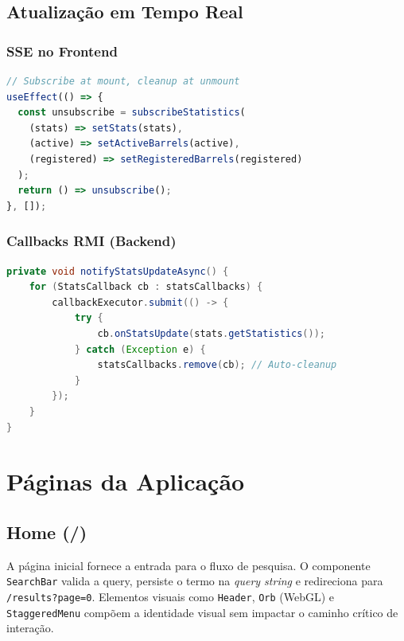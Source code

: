 \documentclass[12pt,a4paper]{article}
\begin{document}
\subsection{Atualização em Tempo Real}

\subsubsection{SSE no Frontend}
\begin{lstlisting}[language=JavaScript, caption={Assinatura SSE com EventSource}]
// Subscribe at mount, cleanup at unmount
useEffect(() => {
  const unsubscribe = subscribeStatistics(
    (stats) => setStats(stats),
    (active) => setActiveBarrels(active),
    (registered) => setRegisteredBarrels(registered)
  );
  return () => unsubscribe();
}, []);
\end{lstlisting}

\subsubsection{Callbacks RMI (Backend)}
\begin{lstlisting}[language=Java, caption={Notificação assíncrona}]
private void notifyStatsUpdateAsync() {
    for (StatsCallback cb : statsCallbacks) {
        callbackExecutor.submit(() -> {
            try {
                cb.onStatsUpdate(stats.getStatistics());
            } catch (Exception e) {
                statsCallbacks.remove(cb); // Auto-cleanup
            }
        });
    }
}
\end{lstlisting}

\newpage

\section{Páginas da Aplicação}

\subsection{Home (/)}
A página inicial fornece a entrada para o fluxo de pesquisa. O componente \texttt{SearchBar} valida a query, persiste o termo na \textit{query string} e redireciona para \texttt{/results?page=0}. Elementos visuais como \texttt{Header}, \texttt{Orb} (WebGL) e \texttt{StaggeredMenu} compõem a identidade visual sem impactar o caminho crítico de interação.
\end{document}

